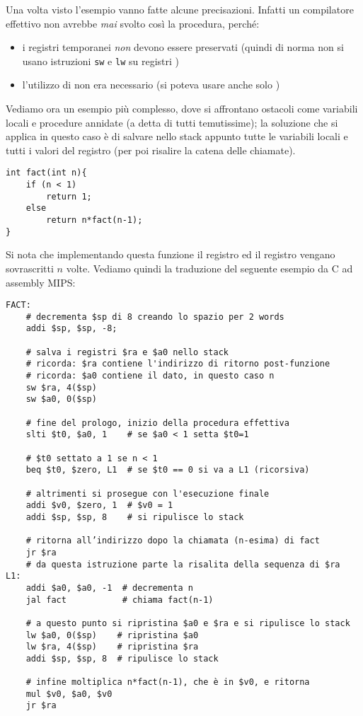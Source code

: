 Una volta visto l'esempio vanno fatte alcune precisazioni. Infatti un compilatore effettivo non avrebbe \emph{mai} svolto così la procedura, perché:
\begin{itemize}
	\item i registri temporanei \emph{non} devono essere preservati (quindi di norma non si usano istruzioni \texttt{sw} e \texttt{lw} su registri )
	\item l'utilizzo di  non era necessario (si poteva usare anche solo )
\end{itemize}

Vediamo ora un esempio più complesso, dove si affrontano ostacoli come variabili locali e procedure annidate (a detta di tutti temutissime); la soluzione che si applica in questo caso è di salvare nello stack appunto tutte le variabili locali e tutti i valori del registro  (per poi risalire la catena delle chiamate).

\begin{verbatim}
int fact(int n){
	if (n < 1)
		return 1;
	else
		return n*fact(n-1);
}
\end{verbatim}

Si nota che implementando questa funzione il registro  ed il registro  vengano sovrascritti $n$ volte.
Vediamo quindi la traduzione del seguente esempio da C ad assembly MIPS:

\begin{verbatim}
FACT:
	# decrementa $sp di 8 creando lo spazio per 2 words
	addi $sp, $sp, -8;

	# salva i registri $ra e $a0 nello stack
	# ricorda: $ra contiene l'indirizzo di ritorno post-funzione
	# ricorda: $a0 contiene il dato, in questo caso n
	sw $ra, 4($sp)
	sw $a0, 0($sp)

	# fine del prologo, inizio della procedura effettiva
	slti $t0, $a0, 1    # se $a0 < 1 setta $t0=1

	# $t0 settato a 1 se n < 1
	beq $t0, $zero, L1  # se $t0 == 0 si va a L1 (ricorsiva)

	# altrimenti si prosegue con l'esecuzione finale
	addi $v0, $zero, 1  # $v0 = 1
	addi $sp, $sp, 8    # si ripulisce lo stack

	# ritorna all’indirizzo dopo la chiamata (n-esima) di fact
	jr $ra
	# da questa istruzione parte la risalita della sequenza di $ra
L1:
	addi $a0, $a0, -1  # decrementa n
	jal fact           # chiama fact(n-1)

	# a questo punto si ripristina $a0 e $ra e si ripulisce lo stack
	lw $a0, 0($sp)    # ripristina $a0
	lw $ra, 4($sp)    # ripristina $ra
	addi $sp, $sp, 8  # ripulisce lo stack

	# infine moltiplica n*fact(n-1), che è in $v0, e ritorna
	mul $v0, $a0, $v0
	jr $ra
\end{verbatim}

